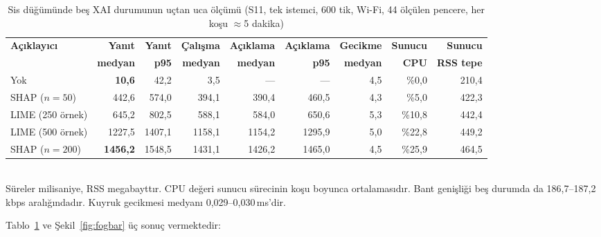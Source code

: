 \documentclass[conference]{IEEEtran}
\newcommand{\ms}{\,ms\xspace}
\begin{document}
\begin{table}[t]
\caption{Sis düğümünde beş XAI durumunun uçtan uca ölçümü (S11, tek istemci,
600 tik, Wi-Fi, 44 ölçülen pencere, her koşu $\approx$5 dakika)}
\label{tab:fog-xai}
\centering
\small
\begin{tabular}{lrrrrrrrr}
\toprule
\textbf{Açıklayıcı} & \textbf{Yanıt} & \textbf{Yanıt} & \textbf{Çalışma} & \textbf{Açıklama} & \textbf{Açıklama} & \textbf{Gecikme} & \textbf{Sunucu} & \textbf{Sunucu}\\
 & \textbf{medyan} & \textbf{p95} & \textbf{medyan} & \textbf{medyan} & \textbf{p95} & \textbf{medyan} & \textbf{CPU} & \textbf{RSS tepe}\\
\midrule
Yok                          & \textbf{10{,}6}   & 42{,}2    & 3{,}5     & ---       & ---       & 4{,}5 & \%0{,}0  & 210{,}4\\
SHAP ($n{=}50$)              & 442{,}6           & 574{,}0   & 394{,}1   & 390{,}4   & 460{,}5   & 4{,}3 & \%5{,}0  & 422{,}3\\
LIME (250 örnek)             & 645{,}2           & 802{,}5   & 588{,}1   & 584{,}0   & 650{,}6   & 5{,}3 & \%10{,}8 & 442{,}4\\
LIME (500 örnek)             & 1227{,}5          & 1407{,}1  & 1158{,}1  & 1154{,}2  & 1295{,}9  & 5{,}0 & \%22{,}8 & 449{,}2\\
SHAP ($n{=}200$)             & \textbf{1456{,}2} & 1548{,}5  & 1431{,}1  & 1426{,}2  & 1465{,}0  & 4{,}5 & \%25{,}9 & 464{,}5\\
\bottomrule
\end{tabular}
\\[2pt]
\footnotesize Süreler milisaniye, RSS megabayttır. CPU değeri sunucu sürecinin
koşu boyunca ortalamasıdır. Bant genişliği beş durumda da 186{,}7--187{,}2\,kbps
aralığındadır. Kuyruk gecikmesi medyanı 0{,}029--0{,}030\ms'dir.
\end{table}

Tablo~\ref{tab:fog-xai} ve Şekil~\ref{fig:fogbar} üç sonuç vermektedir:
\end{document}
